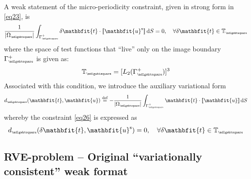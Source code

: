 \documentclass[12pt,a4paper]{article}
\renewcommand{\ta}[1]{\mathbfit{#1}}
\renewcommand{\Box}{\mdlgwhtsquare}
\DeclarePairedDelimiter{\jmp}{[\![}{]\!]}
\newcommand{\volume}{|\Omega_\rve|}
\newcommand{\rve}{
  {\mathchoice
   {\mbox{\scalebox{0.67}{$\Box$}}}
   {\mbox{\scalebox{0.67}{$\Box$}}}
   {\mbox{\scalebox{0.5}{$\Box$}}}
   {\mbox{\scalebox{0.375}{$\Box$}}}
  }
}
\begin{document}
A weak statement of the micro-periodicity constraint, given in strong form in \cref{eq23}, is
\begin{equation}
    \frac{1}{\volume}\int_{\Gamma_\rve^+} \delta \ta{t} \cdot \jmp{\ta{u}^\fluct} \dif S = 0,
    \quad \forall \delta \ta{t}\in\set{T}_\rve
\label{eq26}
\end{equation}
where the space of test functions that ``live'' only on the image boundary $\Gamma_\rve^+$ is given as:
\begin{equation}
    \set{T}_\rve = [L_2(\Gamma_\rve^+)]^{3}
\label{eq25a}
\end{equation}
Associated with this condition, we introduce the auxiliary variational form
\begin{equation}
    d_\rve(\ta{t},\ta{u}) \defeq
    - \frac{1}{\volume}\int_{\Gamma_\rve^+} \ta{t} \cdot \jmp{\ta{u}} \dif S
\label{eq27}
\end{equation}
whereby the constraint \cref{eq26} is expressed as
\begin{equation}
    d_\rve(\delta\ta{t},\ta{u}^\fluct) = 0, \quad \forall \delta \ta{t}\in\set{T}_\rve
\label{eq27a}
\end{equation}

\subsection{RVE-problem -- Original ``variationally consistent'' weak format}
\end{document}
